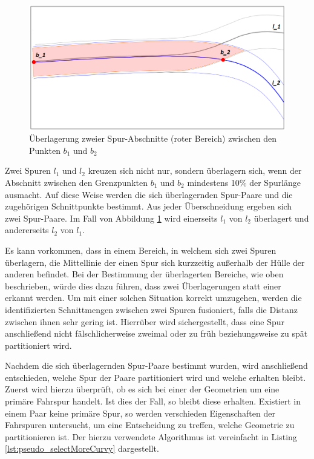 \begin{figure}[H]
    \centering
    \includegraphics[width=0.5\linewidth]{resources/img/umsetzung/U2/lane_crossing}
    \caption[Überlagerung zweier Spur-Abschnitte]
            {Überlagerung zweier Spur-Abschnitte (roter Bereich) zwischen den Punkten $b_1$ und $b_2$}
    \label{fig:real2_lane_crossing}
\end{figure}

Zwei Spuren $l_1$ und $l_2$ kreuzen sich nicht nur, sondern überlagern sich, wenn der Abschnitt zwischen
den Grenzpunkten $b_1$ und $b_2$ mindestens 10\% der Spurlänge ausmacht. Auf diese Weise werden die
sich überlagernden Spur-Paare und die zugehörigen Schnittpunkte bestimmt.
Aus jeder Überschneidung ergeben sich zwei Spur-Paare.
Im Fall von Abbildung \ref{fig:real2_lane_crossing} wird einerseits $l_1$ von $l_2$ überlagert und andererseits
$l_2$ von $l_1$.

Es kann vorkommen, dass in einem Bereich, in welchem sich zwei Spuren überlagern,
die Mittellinie der einen Spur sich kurzzeitig außerhalb der Hülle der anderen befindet. Bei der Bestimmung
der überlagerten Bereiche, wie oben beschrieben, würde dies dazu führen, dass zwei Überlagerungen statt einer
erkannt werden. Um mit einer solchen Situation korrekt umzugehen, werden die identifizierten Schnittmengen
zwischen zwei Spuren fusioniert, falls die Distanz zwischen ihnen sehr gering ist.
Hierrüber wird sichergestellt, dass eine Spur anschließend nicht fälschlicherweise zweimal
oder zu früh beziehungsweise zu spät partitioniert wird.

Nachdem die sich überlagernden Spur-Paare bestimmt wurden, wird anschließend
entschieden, welche Spur der Paare partitioniert wird und welche erhalten bleibt. Zuerst wird hierzu
überprüft, ob es sich bei einer der Geometrien um eine primäre Fahrspur handelt. Ist dies der Fall, so
bleibt diese erhalten. Existiert in einem Paar keine primäre Spur, so werden verschieden Eigenschaften
der Fahrspuren untersucht, um eine Entscheidung zu treffen, welche Geometrie zu partitionieren ist.
Der hierzu verwendete Algorithmus ist vereinfacht in Listing \ref{lst:pseudo_selectMoreCurvy} dargestellt.

